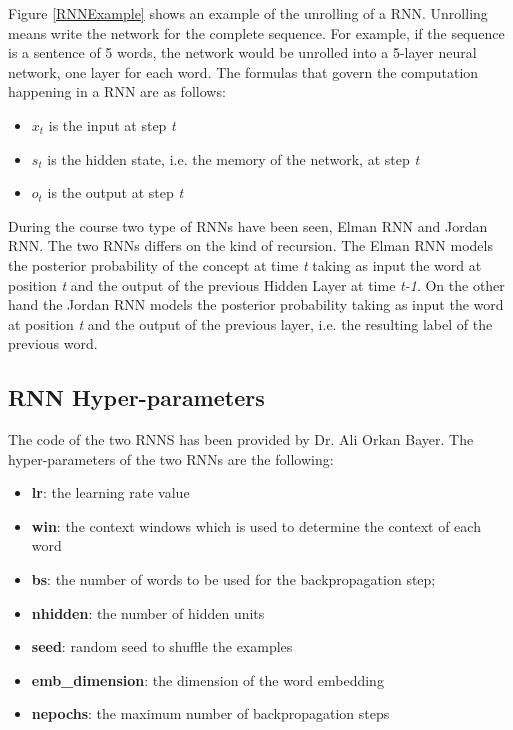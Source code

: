 \documentclass[11pt,a4paper]{article}
\begin{document}
Figure \ref{RNNExample} shows an example of the unrolling of a RNN. Unrolling means write the network for the complete sequence. For example, if the sequence is a sentence of 5 words, the network would be unrolled into a 5-layer neural network, one layer for each word. The formulas that govern the computation happening in a RNN are as follows:

\begin{itemize}
    \item $x_{t}$ is the input at step \textit{t}
    \item $s_{t}$ is the hidden state, i.e. the memory of the network, at step \textit{t}
    \item $o_{t}$ is the output at step \textit{t}
\end{itemize}
During the course two type of RNNs have been seen, Elman RNN and Jordan RNN. The two RNNs differs on the kind of recursion. The Elman RNN models the posterior probability of the concept at time \textit{t} taking as input the word at position \textit{t} and the output of the previous Hidden Layer at time \textit{t-1}. On the other hand the Jordan RNN models the posterior probability taking as input the word at position \textit{t} and the output of the previous layer, i.e. the resulting label of the previous word.\\
\subsection{RNN Hyper-parameters}
The code of the two RNNS has been provided by Dr. Ali Orkan Bayer.
The hyper-parameters of the two RNNs are the following:
\begin{itemize}
    \item \textbf{lr}: the learning rate value
    \item \textbf{win}: the context windows which is used to determine the context of each word
    \item \textbf{bs}: the number of words to be used for the backpropagation step;
    \item \textbf{nhidden}:  the number of hidden units
    \item \textbf{seed}: random seed to shuffle the examples
    \item \textbf{emb\_dimension}: the dimension of the word embedding
    \item \textbf{nepochs}: the maximum number of backpropagation steps
\end{itemize}
\end{document}
